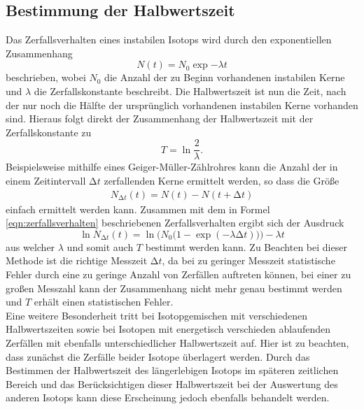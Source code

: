 \subsection{Bestimmung der Halbwertszeit}
Das Zerfallsverhalten eines instabilen Isotops wird durch den exponentiellen Zusammenhang
\begin{equation}
  N(t) = N_0 \exp{-\lambda t}
  \label{eqn:zerfallsverhalten}
\end{equation}
beschrieben, wobei $N_0$ die Anzahl der zu Beginn vorhandenen instabilen Kerne und $\lambda$ die Zerfallskonstante beschreibt.
Die Halbwertszeit ist nun die Zeit, nach der nur noch die Hälfte der ursprünglich vorhandenen instabilen Kerne vorhanden sind.
Hieraus folgt direkt der Zusammenhang der Halbwertszeit mit der Zerfallskonstante zu
\begin{equation}
  T = \ln{\frac{2}{\lambda}}.
  \label{eqn:halbwertszeit}
\end{equation}
Beispielsweise mithilfe eines Geiger-Müller-Zählrohres kann die Anzahl der in einem Zeitintervall $\increment t$ zerfallenden Kerne ermittelt werden, so dass die Größe
\begin{align*}
  N_{\increment t}(t) = N(t) - N(t + \increment t)
\end{align*}
einfach ermittelt werden kann.
Zusammen mit dem in Formel \eqref{eqn:zerfallsverhalten} beschriebenen Zerfallsverhalten ergibt sich der Ausdruck
\begin{equation}
  \ln{ N_{\increment t}}(t) = \ln{\bigl( N_0 (1- \exp{(-\lambda \increment t)}} )\bigr) - \lambda t
  \label{eqn:totalwichtigeformel}
\end{equation}
aus welcher $\lambda$ und somit auch $T$ bestimmt werden kann.
Zu Beachten bei dieser Methode ist die richtige Messzeit $\increment t$, da bei zu geringer Messzeit statistische Fehler durch eine zu geringe Anzahl von Zerfällen auftreten können, bei einer zu großen Messzahl kann der Zusammenhang nicht mehr genau bestimmt werden und $T$ erhält einen statistischen Fehler.\\
Eine weitere Besonderheit tritt bei Isotopgemischen mit verschiedenen Halbwertszeiten sowie bei Isotopen mit energetisch verschieden ablaufenden Zerfällen mit ebenfalls unterschiedlicher Halbwertszeit auf.
Hier ist zu beachten, dass zunächst die Zerfälle beider Isotope überlagert werden.
Durch das Bestimmen der Halbwertszeit des längerlebigen Isotops im späteren zeitlichen Bereich und das Berücksichtigen dieser Halbwertszeit bei der Auswertung des anderen Isotops kann diese Erscheinung jedoch ebenfalls behandelt werden.


